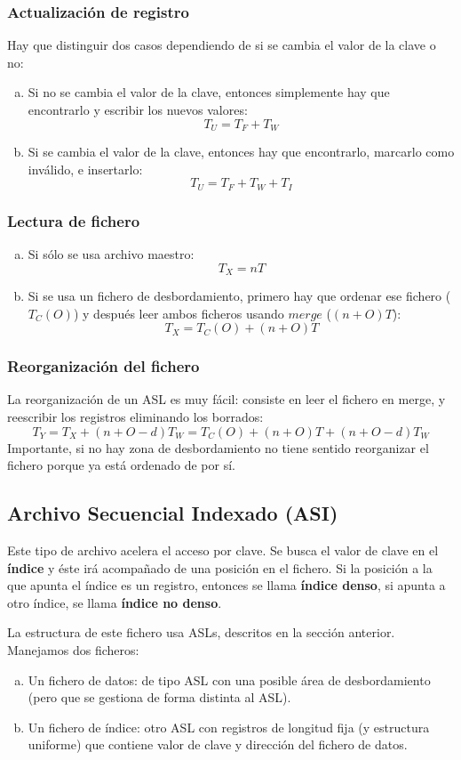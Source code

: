 \subsubsection{Actualización de registro}
Hay que distinguir dos casos dependiendo de si se cambia el valor de la clave o no:
\begin{enumerate}[(a)]
\item Si no se cambia el valor de la clave, entonces simplemente hay que encontrarlo y escribir los nuevos valores:
\[
T_U=T_F+T_W
\]
\item Si se cambia el valor de la clave, entonces hay que encontrarlo, marcarlo como inválido, e insertarlo:
\[
T_U=T_F+T_W+T_I
\]
\end{enumerate}
\subsubsection{Lectura de fichero}
\begin{enumerate}[(a)]
\item Si sólo se usa archivo maestro:
\[
T_X=nT
\]
\item Si se usa un fichero de desbordamiento, primero hay que ordenar ese fichero ($T_C(O)$) y después leer ambos ficheros usando $merge$ ($(n+O)T$):
\[
T_X=T_C(O)+(n+O)T
\]
\end{enumerate}
\subsubsection{Reorganización del fichero}
La reorganización de un ASL es muy fácil: consiste en leer el fichero en merge, y reescribir los registros eliminando los borrados:
\[
T_Y=T_X+(n+O-d)T_W=T_C(O)+(n+O)T+(n+O-d)T_W
\]
Importante, si no hay zona de desbordamiento no tiene sentido reorganizar el fichero porque ya está ordenado de por sí.
\subsection{Archivo Secuencial Indexado (ASI)}

Este tipo de archivo acelera el acceso por clave. Se busca el valor de clave en el \textbf{índice} y éste irá acompañado de una posición en el fichero. Si la posición a la que apunta el índice es un registro, entonces se llama \textbf{índice denso}, si apunta a otro índice, se llama \textbf{índice no denso}.

La estructura de este fichero usa ASLs, descritos en la sección anterior. Manejamos dos ficheros:
\begin{enumerate}[(a)]
\item Un fichero de datos: de tipo ASL con una posible área de desbordamiento (pero que se gestiona de forma distinta al ASL).
\item Un fichero de índice: otro ASL con registros de longitud fija (y estructura uniforme) que contiene valor de clave y dirección del fichero de datos.
\end{enumerate}

